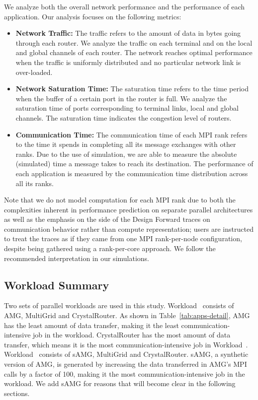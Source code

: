 We analyze both the overall network performance and the performance of each application.
Our analysis focuses on the following metrics:
\begin{itemize}

    \item \textbf{Network Traffic:} The traffic refers to the amount of data in bytes going through each router. We analyze the traffic on each terminal and on the local and global channels of each router. The network reaches optimal performance when the traffic is uniformly distributed and no particular network link is over-loaded. 
            
    \item \textbf{Network Saturation Time:} The saturation time refers to the time period when the buffer of a certain port in the router is full. We analyze the saturation time of ports corresponding to terminal links, local and global channels. The saturation time indicates the congestion level of routers. 
    
    \item \textbf{Communication Time:} The communication time of each MPI rank refers to the time it spends in completing all its message exchanges with other ranks. Due to the use of simulation, we are able to measure the absolute (simulated) time a message takes to reach its destination. The performance of each application is measured by the communication time distribution across all its ranks.    
    
    \end{itemize}

Note that we do not model computation for each MPI rank due to both the complexities inherent in performance prediction on separate parallel architectures as well as the emphasis on the side of the Design Forward traces on communication behavior rather than compute representation; users are instructed to treat the traces as if they came from one MPI rank-per-node configuration, despite being gathered using a rank-per-core approach. We follow the recommended interpretation in our simulations. 

\subsection{Workload Summary}
\label{sec:workload summary}

Two sets of parallel workloads are used in this study. Workload~ consists of AMG, MultiGrid and CrystalRouter. As shown in Table~\ref{tab:apps-detail}, AMG has the least amount of data transfer, making it the least communication-intensive job in the workload. 
CrystalRouter has the most amount of data transfer, which means it is the most communication-intensive job in Workload~. 
Workload~ consists of sAMG, MultiGrid and CrystalRouter. sAMG, a synthetic version of AMG, is generated by increasing the data transferred in AMG's MPI calls by a factor of 100, making it the most communication-intensive job in the workload. We add sAMG for reasons that will become clear in the following sections.

